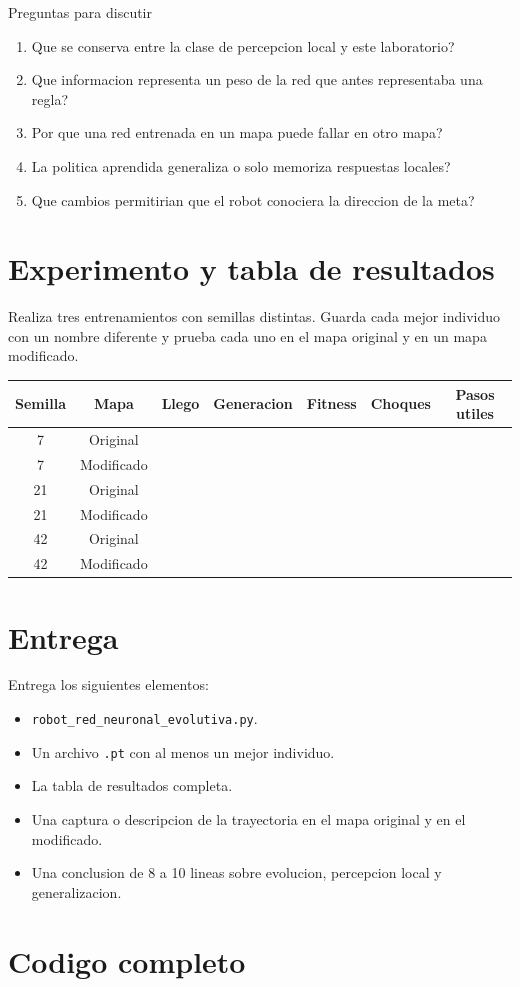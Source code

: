 \documentclass[11pt,a4paper]{article}
\begin{document}
\begin{reto}{Preguntas para discutir}
\begin{enumerate}[leftmargin=*]
  \item Que se conserva entre la clase de percepcion local y este laboratorio?
  \item Que informacion representa un peso de la red que antes representaba una regla?
  \item Por que una red entrenada en un mapa puede fallar en otro mapa?
  \item La politica aprendida generaliza o solo memoriza respuestas locales?
  \item Que cambios permitirian que el robot conociera la direccion de la meta?
\end{enumerate}
\end{reto}

\section{Experimento y tabla de resultados}
Realiza tres entrenamientos con semillas distintas. Guarda cada mejor individuo con un nombre diferente y prueba cada uno en el mapa original y en un mapa modificado.

\begin{center}
\begin{tabular}{c|c|c|c|c|c|c}
\toprule
Semilla & Mapa & Llego & Generacion & Fitness & Choques & Pasos utiles \\
\midrule
7 & Original & & & & & \\
7 & Modificado & & & & & \\
21 & Original & & & & & \\
21 & Modificado & & & & & \\
42 & Original & & & & & \\
42 & Modificado & & & & & \\
\bottomrule
\end{tabular}
\end{center}

\section{Entrega}
Entrega los siguientes elementos:

\begin{itemize}[leftmargin=*]
  \item \texttt{robot\_red\_neuronal\_evolutiva.py}.
  \item Un archivo \texttt{.pt} con al menos un mejor individuo.
  \item La tabla de resultados completa.
  \item Una captura o descripcion de la trayectoria en el mapa original y en el modificado.
  \item Una conclusion de 8 a 10 lineas sobre evolucion, percepcion local y generalizacion.
\end{itemize}

\section{Codigo completo}

\end{document}
